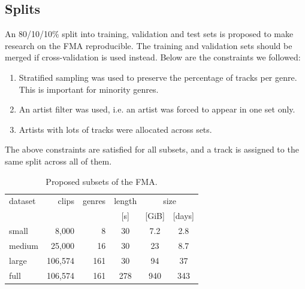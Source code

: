 \documentclass{article}
\newcommand{\ntracks}{106,574 }
\newcommand{\tduration}{343 }
\newcommand{\aduration}{278 }
\newcommand{\size}{940 }
\begin{document}
\subsection{Splits}

An 80/10/10\% split into training, validation and test sets is proposed to make research on the FMA reproducible. The training and validation sets should be merged if cross-validation is used instead.
Below are the constraints we followed:
\begin{enumerate}
	\item Stratified sampling was used to preserve the percentage of tracks per genre. This is important for minority genres.
	\item An artist filter was used, i.e. an artist was forced to appear in one set only. %
	\item Artists with lots of tracks were allocated across sets. %
\end{enumerate}
The above constraints are satisfied for all subsets, and a track is assigned to the same split across all of them.

\begin{table}
	\centering
	\begin{tabular}{lrrccc}
		\toprule
		dataset & clips & genres & length & \multicolumn{2}{c}{size} \\
		\cmidrule{5-6}
		        &       &        &  [s]   & [GiB] & [days] \\
		\midrule
		small  &    8,000 &   8 &  30 &  7.2 & 2.8  \\
		medium &   25,000 &  16 &  30 & 23   & 8.7  \\
		large  & \ntracks & 161 &  30 & 94   & 37 \\
		full   & \ntracks & 161 & \aduration & \size & \tduration  \\
		\bottomrule
	\end{tabular}
	\caption{Proposed subsets of the FMA.}
	\label{tab:subsets}
\end{table}
\end{document}
